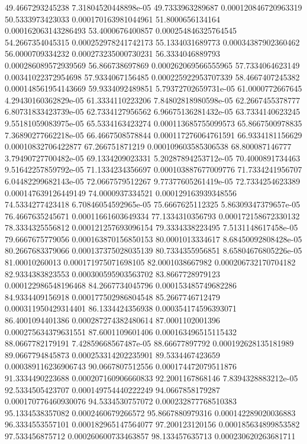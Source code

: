 {49.4667293245238 7.31804520448898e-05
49.7333963289687 0.000120846720963319
50.5333973423033 0.000170163981044961
51.8000656134164 0.000162063143286493
53.4000676400857 0.000254846325764545
54.2667354045315 0.000252978241742173
55.1334031689773 0.00034387902360462
56.0000709334232 0.000273235000730231
56.3334046889793 0.000286089572939569
56.866738697869 0.000262069566555965
57.7334064623149 0.00341022372954698
57.9334067156485 0.000225922953707339
58.4667407245382 0.000148561954143669
59.9334092489851 5.79372702659731e-05
61.0000772667645 4.29430160362829e-05
61.3334110223206 7.84802818980598e-05
62.2667455378777 6.80731833423739e-05
62.7334127956562 6.96675136281432e-05
63.7334140623245 9.55181059083975e-05
65.5334163423274 0.000113685755099573
65.8667500978835 7.36890277662218e-05
66.4667508578844 0.000117276064761591
66.9334181156629 0.00010832706422877
67.266751871219 0.000109603585306538
68.800087146777 3.79490727700482e-05
69.1334209023331 5.20287894253712e-05
70.4000891734463 9.51642257859792e-05
71.1334234356697 0.000103887677009776
71.7334241956707 6.04482299682143e-05
72.0667579512267 9.77377605261419e-05
72.7334254623389 0.000147639126449149
74.0000937334521 0.000129163939348556
74.5334277423418 6.70846054592965e-05
75.6667625112325 5.86309347379657e-05
76.4667635245671 0.00011661603649334
77.1334310356793 0.000172158672330132
78.3334325556812 0.000121257693096154
79.3334338223495 7.5131148617458e-05
79.6667675779056 0.000163870156850153
80.0001013334617 8.68450092808428e-05
80.2667683379066 0.000137375028035139
80.7334355956851 8.65804676805226e-05
81.00010260013 0.000171975071698105
82.0001038667982 0.000206732170704182
82.9334383823553 0.000300595903563702
83.8667728979123 0.000122986548196468
84.2667734045796 0.000153485749682286
84.9334409156918 0.000177502986804548
85.2667746712479 0.000311950429314401
86.1334424356938 0.000354174596393071
86.4001094401386 0.000287274382480614
87.0001102001396 0.000275634379631551
87.6001109601406 0.000163496515115432
88.0667782179191 7.42859668567487e-05
88.66677897792 0.000192628135181989
89.0667794845873 0.000253314202235901
89.5334467423659 0.000389116236906743
90.0667807512556 0.000174472079511876
91.3334490223688 0.000207160906660833
92.2001167868146 7.8394328883212e-05
92.5334505423707 0.000149754440222249
94.0667858179287 0.000170776460930076
94.5334530757072 0.000232877768510383
95.1334538357082 0.0002460679266572
95.8667880979316 0.000142289020036883
96.3334553557101 0.000182965147564077
97.200123120156 0.000185634899853582
97.533456875712 0.000260600733463857
98.133457635713 0.000230620263681711
}
